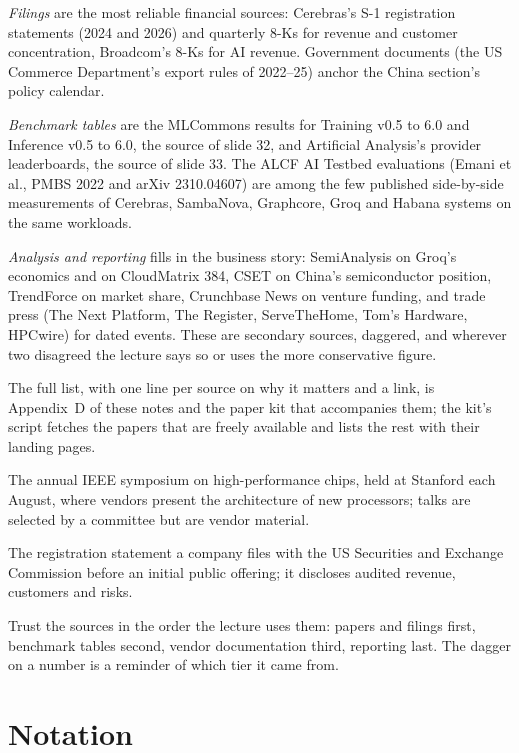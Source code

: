 \documentclass[11pt,letterpaper]{article}
\newcommand{\setstage}[1]{\colorlet{stagec}{#1}}
\newenvironment{terms}{\begin{tcolorbox}[termsbox]\begin{description}[leftmargin=1.1em,itemsep=3pt,topsep=2pt,font=\normalfont]}{\end{description}\end{tcolorbox}}
\newcommand{\term}[2]{\item[\textbf{#1}]\index{#1} #2}
\newenvironment{intuition}{\begin{tcolorbox}[intuitionbox]}{\end{tcolorbox}}
\begin{document}
\emph{Filings} are the most reliable financial sources: Cerebras's S-1 registration statements (2024 and 2026) and quarterly 8-Ks for revenue and customer concentration, Broadcom's 8-Ks for AI revenue. Government documents (the US Commerce Department's export rules of 2022--25) anchor the China section's policy calendar.

\emph{Benchmark tables} are the MLCommons results for Training v0.5 to 6.0 and Inference v0.5 to 6.0, the source of slide 32, and Artificial Analysis's provider leaderboards, the source of slide 33. The ALCF AI Testbed evaluations (Emani et al., PMBS 2022 and arXiv 2310.04607) are among the few published side-by-side measurements of Cerebras, SambaNova, Graphcore, Groq and Habana systems on the same workloads.

\emph{Analysis and reporting} fills in the business story: SemiAnalysis on Groq's economics and on CloudMatrix 384, CSET on China's semiconductor position, TrendForce on market share, Crunchbase News on venture funding, and trade press (The Next Platform, The Register, ServeTheHome, Tom's Hardware, HPCwire) for dated events. These are secondary sources, daggered, and wherever two disagreed the lecture says so or uses the more conservative figure.

The full list, with one line per source on why it matters and a link, is Appendix~D of these notes and the paper kit that accompanies them; the kit's script fetches the papers that are freely available and lists the rest with their landing pages.

\begin{terms}
\term{Hot Chips}{The annual IEEE symposium on high-performance chips, held at Stanford each August, where vendors present the architecture of new processors; talks are selected by a committee but are vendor material.}
\term{S-1}{The registration statement a company files with the US Securities and Exchange Commission before an initial public offering; it discloses audited revenue, customers and risks.}
\end{terms}

\begin{intuition}
Trust the sources in the order the lecture uses them: papers and filings first, benchmark tables second, vendor documentation third, reporting last. The dagger on a number is a reminder of which tier it came from.
\end{intuition}
\clearpage
\appendix
\setstage{ink}
\section{Notation}
\end{document}
